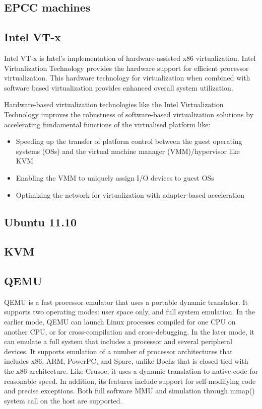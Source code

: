 \documentclass[12pt,a4paper]{report}
\begin{document}
\subsection{EPCC machines}
\subsection{Intel VT-x}

Intel VT-x is Intel's implementation of hardware-assisted x86 virtualization.
Intel Virtualization Technology provides the hardware support for efficient processor virtualization.
This hardware technology for virtualization when combined with software based virtualization provides 
enhanced overall system utilization.\cite{website:intel-VT}

Hardware-based virtualization technologies like the Intel Virtualization Technology
improves the robustness of software-based virtualization solutions by accelerating
fundamental functions of the virtualised platform like:\cite{neiger2006intel}

\begin{itemize}
 \item Speeding up the transfer of platform control between the guest operating systems (OSs) and the virtual machine manager (VMM)/hypervisor like KVM
 \item Enabling the VMM to uniquely assign I/O devices to guest OSs
 \item Optimizing the network for virtualization with adapter-based acceleration
\end{itemize}





\subsection{Ubuntu 11.10}
\subsection{KVM}
\subsection{QEMU}

QEMU is a fast processor emulator that uses a portable dynamic translator. It supports two operating
modes: user space only, and full system emulation. In the earlier mode, QEMU can launch Linux processes
compiled for one CPU on another CPU, or for cross-compilation and cross-debugging. In the later mode, it
can emulate a full system that includes a processor and several peripheral devices. It supports emulation of a
number of processor architectures that includes x86, ARM, PowerPC, and Sparc, unlike Bochs that is closed
tied with the x86 architecture. Like Crusoe, it uses a dynamic translation to native code for reasonable speed.
In addition, its features include support for self-modifying code and precise exceptions. Both full software
MMU and simulation through mmap() system call on the host are supported. \cite{chiueh2005survey}
\end{document}
